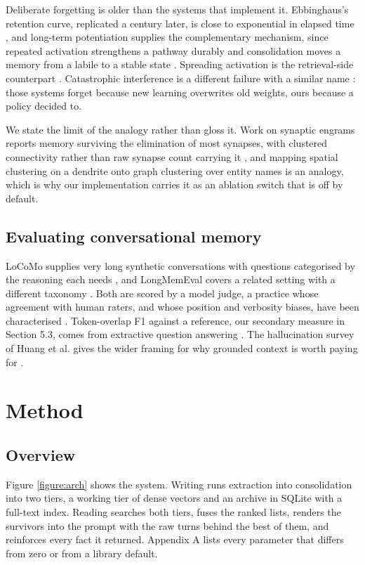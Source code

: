 \documentclass[10pt,a4paper,twocolumn]{article}
\begin{document}
Deliberate forgetting is older than the systems that implement it. Ebbinghaus's retention curve, replicated a century later, is close to exponential in elapsed time \citep{murre2015}, and long-term potentiation supplies the complementary mechanism, since repeated activation strengthens a pathway durably \citep{bliss1973} and consolidation moves a memory from a labile to a stable state \citep{squire2015}. Spreading activation is the retrieval-side counterpart \citep{collins1975,anderson1983}. Catastrophic interference is a different failure with a similar name \citep{mccloskey1989,kirkpatrick2017}: those systems forget because new learning overwrites old weights, ours because a policy decided to.

We state the limit of the analogy rather than gloss it. Work on synaptic engrams reports memory surviving the elimination of most synapses, with clustered connectivity rather than raw synapse count carrying it \citep{lin2026}, and mapping spatial clustering on a dendrite onto graph clustering over entity names is an analogy, which is why our implementation carries it as an ablation switch that is off by default.

\subsection{Evaluating conversational memory}

LoCoMo supplies very long synthetic conversations with questions categorised by the reasoning each needs \citep{maharana2024}, and LongMemEval covers a related setting with a different taxonomy \citep{wu2024}. Both are scored by a model judge, a practice whose agreement with human raters, and whose position and verbosity biases, have been characterised \citep{zheng2023}. Token-overlap F1 against a reference, our secondary measure in Section 5.3, comes from extractive question answering \citep{rajpurkar2016}. The hallucination survey of Huang et al. gives the wider framing for why grounded context is worth paying for \citep{huang2025}.

\section{Method}

\subsection{Overview}

Figure \ref{figure:arch} shows the system. Writing runs extraction into consolidation into two tiers, a working tier of dense vectors and an archive in SQLite with a full-text index. Reading searches both tiers, fuses the ranked lists, renders the survivors into the prompt with the raw turns behind the best of them, and reinforces every fact it returned. Appendix A lists every parameter that differs from zero or from a library default.
\end{document}
